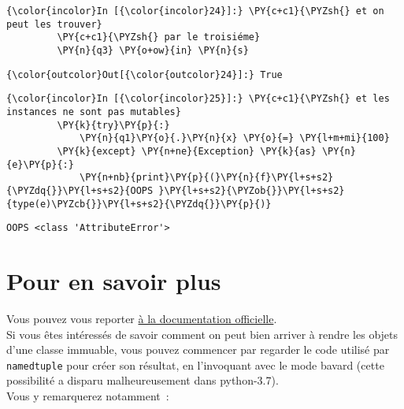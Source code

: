     \begin{Verbatim}[commandchars=\\\{\}]
{\color{incolor}In [{\color{incolor}24}]:} \PY{c+c1}{\PYZsh{} et on peut les trouver}
         \PY{c+c1}{\PYZsh{} par le troisiéme}
         \PY{n}{q3} \PY{o+ow}{in} \PY{n}{s}
\end{Verbatim}


\begin{Verbatim}[commandchars=\\\{\}]
{\color{outcolor}Out[{\color{outcolor}24}]:} True
\end{Verbatim}
            
    \begin{Verbatim}[commandchars=\\\{\}]
{\color{incolor}In [{\color{incolor}25}]:} \PY{c+c1}{\PYZsh{} et les instances ne sont pas mutables}
         \PY{k}{try}\PY{p}{:}
             \PY{n}{q1}\PY{o}{.}\PY{n}{x} \PY{o}{=} \PY{l+m+mi}{100}
         \PY{k}{except} \PY{n+ne}{Exception} \PY{k}{as} \PY{n}{e}\PY{p}{:}
             \PY{n+nb}{print}\PY{p}{(}\PY{n}{f}\PY{l+s+s2}{\PYZdq{}}\PY{l+s+s2}{OOPS }\PY{l+s+s2}{\PYZob{}}\PY{l+s+s2}{type(e)\PYZcb{}}\PY{l+s+s2}{\PYZdq{}}\PY{p}{)}
\end{Verbatim}


    \begin{Verbatim}[commandchars=\\\{\}]
OOPS <class 'AttributeError'>

    \end{Verbatim}

    \hypertarget{pour-en-savoir-plus}{%
\section{Pour en savoir plus}\label{pour-en-savoir-plus}}

    Vous pouvez vous reporter
\href{https://docs.python.org/3/library/collections.html\#collections.namedtuple}{à
la documentation officielle}.\\

    Si vous êtes intéressés de savoir comment on peut bien arriver à rendre
les objets d'une classe immuable, vous pouvez commencer par regarder le
code utilisé par \texttt{namedtuple} pour créer son résultat, en
l'invoquant avec le mode bavard (cette possibilité a disparu
malheureusement dans python-3.7).\\

Vous y remarquerez notamment~:

